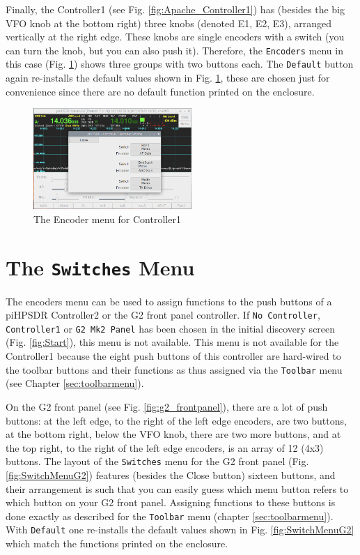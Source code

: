 \documentclass[12pt]{book}
\def\rett#1{\texttt{\color{red}#1}}
\def\bltt#1{\texttt{\color{blue}#1}}
\def\pH{pi\-HPSDR }
\begin{document}
Finally, the Controller1 (see Fig. \ref{fig:Apache_Controller1})
has (besides the big VFO knob at the bottom right)
three knobs (denoted E1, E2, E3), arranged vertically at the right edge. These knobs
are single encoders with a switch (you can turn the knob, but you can also push it). Therefore,
the \bltt{Encoders} menu in this case (Fig. \ref{fig:EncoderMenuV1}) shows three groups with
two buttons each. The \rett{Default} button again re-installs the default values shown in
Fig. \ref{fig:EncoderMenuV1}, these are chosen just for convenience since there are no default
function printed on the enclosure.

\begin{figure}[ht!]
\center
\includegraphics[width=6cm]{EncoderMenuV1.png}
\caption{The Encoder menu for Controller1}
\label{fig:EncoderMenuV1}
\end{figure}

\clearpage
\section{The \texttt{Switches} Menu}

The encoders menu can be used to assign functions to the push buttons of a
\pH  Controller2 or the G2 front panel controller.
If \texttt{No Controller}, \texttt{Controller1} or \texttt{G2 Mk2 Panel}
has been chosen in the initial discovery screen
(Fig. \ref{fig:Start}), this menu is not available. This menu is not available
for the Controller1 because the eight push buttons of this controller are hard-wired to
the toolbar buttons and their functions as thus assigned via the \bltt{Toolbar} menu
(see Chapter \ref{sec:toolbarmenu}).

On the G2 front panel (see Fig. \ref{fig:g2_frontpanel}),
 there are a lot of push buttons: at the left edge, to the right
of the left edge encoders, are two buttons, at the bottom right, below the VFO knob,
there are two more buttons, and at the top right, to the right of the left edge
encoders, is an array of 12 (4x3) buttons. The layout of the \bltt{Switches} menu
for the G2 front panel (Fig. \ref{fig:SwitchMenuG2}) features (besides the Close
button) sixteen buttons, and their arrangement is such that you can easily guess
which menu button refers to which button on your G2 front panel. Assigning functions
to these buttons is done exactly as described for the \bltt{Toolbar} menu
(chapter \ref{sec:toolbarmenu}). With \rett{Default} one re-installs the default values
shown in Fig. \ref{fig:SwitchMenuG2} which match the functions printed on the enclosure.
\end{document}
